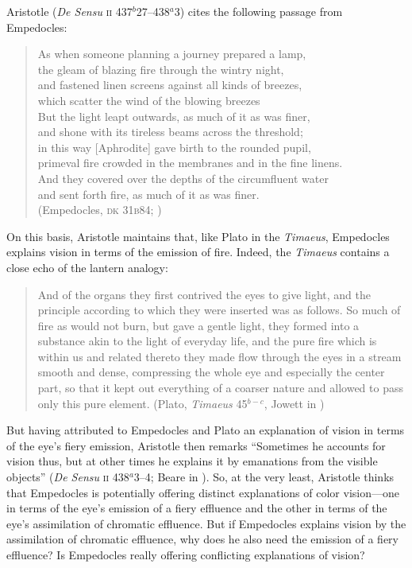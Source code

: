 Aristotle (\emph{De Sensu} \textsc{ii} 437\( ^{b} \)27--438\( ^{a} \)3) cites the following passage from Empedocles:
\begin{verse}
	As when someone planning a journey prepared a lamp,\\
	the gleam of blazing fire through the wintry night,\\
	and fastened linen screens against all kinds of breezes,\\
	which scatter the wind of the blowing breezes\\
	But the light leapt outwards, as much of it as was finer,\\
	and shone with its tireless beams across the threshold;\\
	in this way [Aphrodite] gave birth to the rounded pupil,\\
	primeval fire crowded in the membranes and in the fine linens.\\
	And they covered over the depths of the circumfluent water\\
	and sent forth fire, as much of it as was finer.\\
	(Empedocles, \textsc{dk} 31\textsc{b}84; \citealt[103 259]{Inwood:2001ve})
\end{verse}
On this basis, Aristotle maintains that, like Plato in the \emph{Timaeus}, Empedocles explains vision in terms of the emission of fire. Indeed, the \emph{Timaeus} contains a close echo of the lantern analogy: 
\begin{quote}
	And of the organs they first contrived the eyes to give light, and the principle according to which they were inserted was as follows. So much of fire as would not burn, but gave a gentle light, they formed into a substance akin to the light of everyday life, and the pure fire which is within us and related thereto they made flow through the eyes in a stream smooth and dense, compressing the whole eye and especially the center part, so that it kept out everything of a coarser nature and allowed to pass only this pure element. (Plato, \emph{Timaeus} 45\( ^{b-c} \), Jowett in \citealt{Hamilton:1989fk})
\end{quote}
But having attributed to Empedocles and Plato an explanation of vision in terms of the eye's fiery emission, Aristotle then remarks ``Sometimes he accounts for vision thus, but at other times he explains it by emanations from the visible objects'' (\emph{De Sensu} \textsc{ii} 438\( ^{a} \)3--4; Beare in \citealt[5]{Barnes:1984uq}). So, at the very least, Aristotle thinks that Empedocles is potentially offering distinct explanations of color vision---one in terms of the eye's emission of a fiery effluence and the other in terms of the eye's assimilation of chromatic effluence. But if Empedocles explains vision by the assimilation of chromatic effluence, why does he also need the emission of a fiery effluence? Is Empedocles really offering conflicting explanations of vision?

